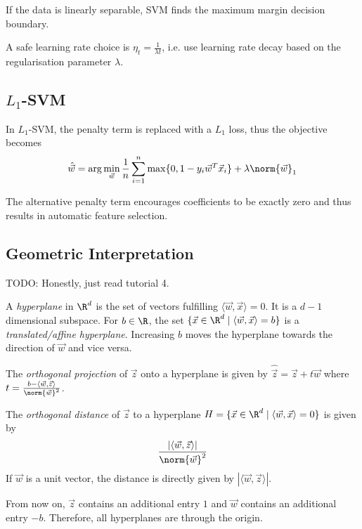 If the data is linearly separable, SVM finds the
maximum margin decision boundary.

A safe learning rate choice is $\eta_t = \frac{1}{\lambda t}$, i.e. use learning rate decay
based on the regularisation parameter $\lambda$.


\subsection{$L_1$-SVM}
In $L_1$-SVM, the penalty term is replaced with a $L_1$ loss,
thus the objective becomes
\begin{equation*}
    \hat{\vec{w}} = \arg\min_{\vec{w}} \frac{1}{n}
    \sum_{i=1}^n \max\{0, 1 - y_i \vec{w}^T \vec{x}_i\}
    + \lambda \norm{\vec{w}}_1
\end{equation*}

The alternative penalty term encourages coefficients to be
exactly zero and thus results in automatic feature selection.


\subsection{Geometric Interpretation}
TODO: Honestly, just read tutorial 4.

A \emph{hyperplane} in $\R^d$ is the
set of vectors fulfilling
$\langle \vec{w}, \vec{x} \rangle = 0$.
It is a $d-1$ dimensional subspace.
For $b \in \R$, the set
$\{\vec{x} \in \R^d \mid \langle \vec{w}, \vec{x} \rangle = b\}$
is a \emph{translated/affine hyperplane}.
Increasing $b$ moves the hyperplane towards
the direction of $\vec{w}$ and vice versa.

The \emph{orthogonal projection} of $\vec{z}$
onto a hyperplane is given by $\hat{\vec{z}} = \vec{z} + t \vec{w}$
where $t = \frac{b - \langle \vec{w}, \vec{z} \rangle}{\norm{\vec{w}}^2}$.

The \emph{orthogonal distance} of $\vec{z}$ to a
hyperplane $H = \{\vec{x} \in \R^d \mid \langle \vec{w}, \vec{x} \rangle = 0\}$
is given by
\begin{equation*}
    \frac{| \langle \vec{w}, \vec{z} \rangle |}{\norm{\vec{w}}^2}
\end{equation*}
If $\vec{w}$ is a unit vector, the distance is directly
given by $|\langle \vec{w}, \vec{z} \rangle|$.

From now on, $\vec{z}$ contains an additional entry
$1$ and $\vec{w}$ contains an additional entry $-b$.
Therefore, all hyperplanes are through the origin.

